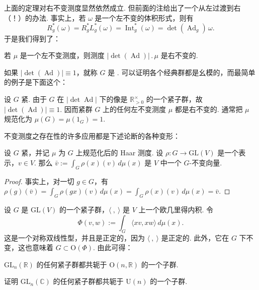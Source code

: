 \begin{numpara}[右不变测度]\label{np:lie-1-10-2}
上面的定理对右不变测度显然依然成立. 但前面的注给出了一个从左过渡到右（！）的办法. 事实上，若 $\omega$ 是一个左不变的体积形式，则有
\[
R_g^{*}(\omega)=R_g^{*}L_g^{*}(\omega)=\operatorname{Int}_g^{*}(\omega)=\det(\operatorname{Ad}_g)\,\omega.
\]
于是我们得到了：
\begin{proposition*}
若 $\mu$ 是一个左不变测度，则测度 $|\det(\operatorname{Ad})|\,.\,\mu$ 是右不变的.
\end{proposition*}
如果 $|\det(\operatorname{Ad})|\equiv 1$，就称 $G$ 是 . 可以证明各个经典群都是幺模的，而最简单的例子是下面这个：
\begin{example*}
设 $G$ 紧. 由于 $G$ 在 $|\det\operatorname{Ad}|$ 下的像是 $\mathbb R^{\times}_{>0}$ 的一个紧子群，故 $|\det(\operatorname{Ad})|\equiv 1$. 因而紧群 $G$ 上的任何左不变测度 $\mu$ 都是右不变的. 通常把 $\mu$ 规范化为 $\mu(G)=\mu(1_G)=1$.
\end{example*}
\end{numpara}

\begin{numpara}[应用]\label{np:lie-1-10-3}
不变测度之存在性的许多应用都是下述论断的各种变形：
\begin{lemma*}
设 $G$ 紧，并记 $\mu$ 为 $G$ 上规范化后的 Haar 测度. 设 $\rho:G\longrightarrow\mathrm{GL}(V)$ 是一个表示，$v\in V$. 那么 $\bar v:=\int_{G}\rho(x)(v)\,d\mu(x)$ 是 $V$ 中一个 $G$-不变向量.
\end{lemma*}
\begin{proof}
事实上，对一切 $g\in G$，有 $\rho(g)(\bar v)=\int_{G}\rho(gx)(v)\,d\mu(x)=\int_{G}\rho(x)(v)\,d\mu(x)=\bar v$.
\end{proof}
\begin{example*}
设 $G$ 是 $\mathrm{GL}(V)$ 的一个紧子群，$\langle\ ,\ \rangle$ 是 $V$ 上一个欧几里得内积. 令
\[
\Phi(v,w):=\int_{G}\langle xv,xw\rangle\,d\mu(x).
\]
这是一个对称双线性型，并且是正定的，因为 $\langle\ ,\ \rangle$ 是正定的. 此外，它在 $G$ 下不变，这也意味着 $G\subset\mathrm{O}(\Phi)$. 由此可得：
\end{example*}
\begin{corollary*}
$\mathrm{GL}_n(\mathbb R)$ 的任何紧子群都共轭于 $\mathrm{O}(n,\mathbb R)$ 的一个子群.
\end{corollary*}
\begin{exercise*}
证明 $\mathrm{GL}_n(\mathbb C)$ 的任何紧子群都共轭于 $\mathrm{U}(n)$ 的一个子群.
\end{exercise*}
\end{numpara}
